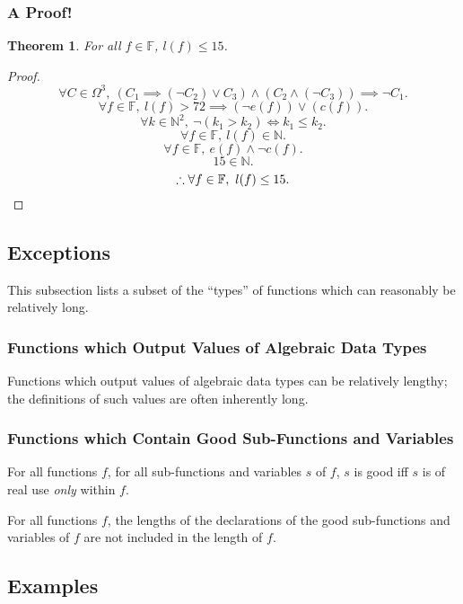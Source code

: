 \documentclass{report}
\newtheorem{thm}{Theorem}
\begin{document}
\subsubsection{A Proof!}
\begin{thm}
        For all $f \in \mathbb F$, $l(f) \leq 15$.
\end{thm}
\begin{proof}
        \[
                \forall C \in \Omega^3,\ 
                \left(C_1 \implies (\neg C_2) \lor C_3\right)
                \land
                \left(C_2 \land (\neg C_3)\right)
                \implies \neg C_1.
        \]
        \[
                \forall f \in \mathbb F,\ 
                l(f) > 72 \implies \left(\neg e(f)\right) \lor \left(c(f)\right).
        \]
        \[
                \forall k \in \mathbb N^2,\ 
                \neg \left(k_1 > k_2\right) \iff k_1 \leq k_2.
        \]
        \[
                \forall f \in \mathbb F,\ 
                l(f) \in \mathbb N.
        \]
        \[
                \forall f \in \mathbb F,\ 
                e(f) \land \neg c(f).
        \]
        \[
                15 \in \mathbb N.
        \]
        \[
                \therefore
                \forall f \in \mathbb F,\ 
                l(f) \leq 15.
                \qedhere
        \]
\end{proof}
\subsection{Exceptions}
This subsection lists a subset of the ``types'' of functions which can reasonably be relatively long.
\subsubsection{Functions which Output Values of Algebraic Data Types}
Functions which output values of algebraic data types can be relatively lengthy; the definitions of such values are often inherently long.
\subsubsection{Functions which Contain Good Sub-Functions and Variables}
For all functions $f$, for all sub-functions and variables $s$ of $f$, $s$ is good iff $s$ is of real use \textit{only} within $f$.

For all functions $f$, the lengths of the declarations of the good sub-functions and variables of $f$ are not included in the length of $f$.
\subsection{Examples}
\end{document}
